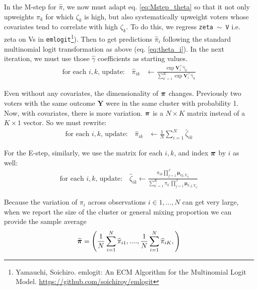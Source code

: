 \documentclass[11pt]{article}
\begin{document}
In the M-step for \(\widehat\pi\), we now must adapt eq. \ref{eq:Mstep_theta} so that it not only upweights \(\pi_k\) for which \(\zeta_k\) is high, but also systematically upweight voters whose covariates tend to correlate with high \(\zeta_k\). To do this, we regress \texttt{zeta  \(\sim\) V} i.e. zeta on Vs in \texttt{emlogit}\footnote{Yamauchi, Soichiro. emlogit: An ECM Algorithm for the Multinomial Logit Model. \url{https://github.com/soichiroy/emlogit}}). Then to get predictions \(\widehat\pi_{i}\) following the standard multinomial logit transformation as above (eq. \ref{eq:theta_i}). In the next iteration, we must use those \(\widehat\gamma\) coefficients as starting values.
\begin{align}
\text{for each \(i, k\), update: }~~~  \widehat{\pi}_{ik} &\leftarrow \frac{\exp{\bm V_{i}^\top \widehat\gamma_k}}{\sum_{k^\prime = 1}^K \exp{\bm V_{i}^\top \widehat\gamma_k}}
\end{align}

Even without any covariates, the dimensionality of \(\bm{\pi}\) changes. Previously two voters with the same outcome \(\bm Y\) were in the same cluster with probability 1. Now, with covariates, there is more variation. \(\bm{\pi}\) is a \(N \times K\) matrix instead of a \(K \times 1\) vector. So we must rewrite:
\begin{align}
\text{for each \(i, k\), update: }~~~  \widehat{\pi}_{ik} &\leftarrow \frac{1}{N}\sum^N_{i = 1}\widehat{\zeta}_{ik}
\end{align}

For the E-step, similarly, we use the matrix for each \(i, k\), and index \(\bm{\pi}\) by \(i\) as well:
\begin{align}
\text{for each \(i, k\), update: }~~~   \widehat\zeta_{ik} \leftarrow \frac{{\pi}_{ik}\prod^{J}_{j=1}\bm{\mu}_{kj,Y_{ij}}}
{\sum^{K}_{k^\prime=1}{\pi}_{k^\prime}\prod^{J}_{j=1}\bm{\mu}_{k^\prime j,Y_{ij}}}
\end{align}

Because the variation of \(\pi_i\) across observations \(i \in 1, ..., N\) can get very large, when we report the size of the cluster or general mixing proportion we can provide the sample average
\begin{align*}
\widetilde{\bm{\pi}} = \left(\frac{1}{N}\sum_{i=1}^N \widehat\pi_{i1}, ...., \frac{1}{N}\sum_{i=1}^N \widehat\pi_{iK},\right)
\end{align*}
\end{document}
